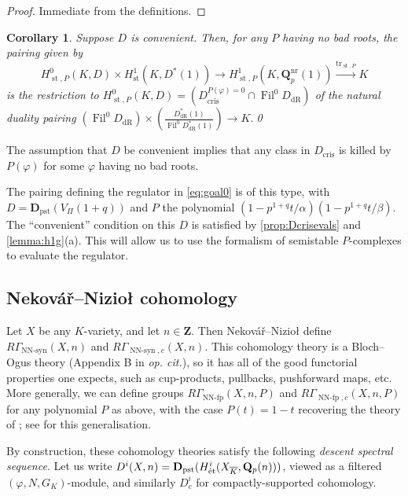 \documentclass[cjm]{ipart}
\theoremstyle{plain}
\newtheorem{corollary}[theorem]{Corollary}
\theoremstyle{remark}
\DeclareMathOperator{\Fil}{Fil}
\DeclareMathOperator{\NNfp}{NN-fp}
\DeclareMathOperator{\NNsyn}{NN-syn}
\DeclareMathOperator{\st}{st}
\DeclareMathOperator{\tr}{tr}
\newcommand{\Dpst}{\mathbf{D}_{\mathrm{pst}}}
\newcommand{\Nek}{Nekov\'a\v{r}\xspace}
\newcommand{\Niz}{Nizio\l\xspace}
\newcommand{\QQ}{\mathbf{Q}}
\newcommand{\Qp}{\QQ_p}
\newcommand{\ZZ}{\mathbf{Z}}
\newcommand{\dR}{\mathrm{dR}}
\newcommand{\et}{\text{\textup{\'et}}}
\numberwithin{equation}{subsection}
\begin{document}
   \begin{proof}
    Immediate from the definitions.
   \end{proof}

   \begin{corollary}
    \label{cor:convenientpair}
    Suppose $D$ is convenient. Then, for any $P$ having no bad roots, the pairing given by
    \[
     H^0_{\st, P}(K, D)\times H^1_{\st}(K, D^*(1)) \longrightarrow H^1_{\st, P}(K, \Qp^{\mathrm{nr}}(1)) \xrightarrow{\tr_{\st, P}} K
    \]
    is the restriction to $H^0_{\st, P}(K, D) = \left(D_{\mathrm{cris}}^{P(\varphi) = 0} \cap \Fil^0 D_{\dR}\right)$ of the natural duality pairing $\left(\Fil^0 D_{\dR}\right) \times \left(\frac{D_{\dR}^*(1)}{\Fil^0 D_{\dR}^*(1)}\right) \to K$.\qed
   \end{corollary}

   \begin{remark}
    The assumption that $D$ be convenient implies that any class in $D_{\mathrm{cris}}$ is killed by $P(\varphi)$ for some $\varphi$ having no bad roots.
   \end{remark}

   The pairing defining the regulator in \cref{eq:goal0} is of this type, with $D = \Dpst\left( V_{\Pi}(1+q)\right)$ and $P$ the polynomial $(1 - p^{1+q} t / \alpha)(1 - p^{1+q} t / \beta)$. The ``convenient'' condition on this $D$ is satisfied by \cref{prop:Dcrisevals} and \cref{lemma:h1g}(a). This will allow us to use the formalism of semistable $P$-complexes to evaluate the regulator.



 \subsection{\Nek--\Niz cohomology}

  Let $X$ be any $K$-variety, and let $n \in \ZZ$. Then \Nek--\Niz \cite{nekovarniziol16} define $R\Gamma_{\NNsyn}(X, n)$ and $R\Gamma_{\NNsyn,c}(X, n)$. This cohomology theory is a Bloch--Ogus theory (Appendix B in \emph{op. cit.}), so it has all of the good functorial properties one expects, such as cup-products, pullbacks, pushforward maps, etc. More generally, we can define groups  $R\Gamma_{\NNfp}(X, n,P)$ and $R\Gamma_{\NNfp,c}(X, n,P)$ for any polynomial $P$ as above, with the case $P(t)=1-t$ recovering the theory of \cite{nekovarniziol16}; see \cite{besserloefflerzerbes16} for this generalisation.


  By construction, these cohomology theories satisfy the following \emph{descent spectral sequence}. Let us write $D^i(X, n) = \Dpst(H^i_{\et}(X_{\overline{K}}, \Qp(n)))$, viewed as a filtered $(\varphi, N, G_K)$-module, and similarly $D^i_c$ for compactly-supported cohomology.
\end{document}

